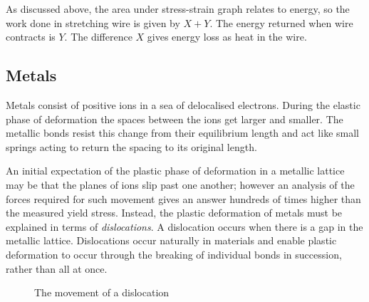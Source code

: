 As discussed above, the area under stress-strain graph relates to energy, so the work done in stretching wire is given by $X+Y$. The energy returned when wire contracts is $Y$. The difference $X$ gives energy loss as heat in the wire.


\subsection{Metals}
Metals consist of positive ions in a sea of delocalised electrons. During the elastic phase of deformation the spaces between the ions get larger and smaller. The metallic bonds resist this change from their equilibrium length and act like small springs acting to return the spacing to its original length.

An initial expectation of the plastic phase of deformation in a metallic lattice may be that the planes of ions slip past one another; however an analysis of the forces required for such movement gives an answer hundreds of times higher than the measured yield stress. Instead, the plastic deformation of metals must be explained in terms of \emph{dislocations}. A dislocation occurs when there is a gap in the metallic lattice. Dislocations occur naturally in materials and enable plastic deformation to occur through the breaking of individual bonds in succession, rather than all at once.

\begin{figure}[h]\begin{center}
    \caption{The movement of a dislocation}\label{disloc}
\end{center}\end{figure}

